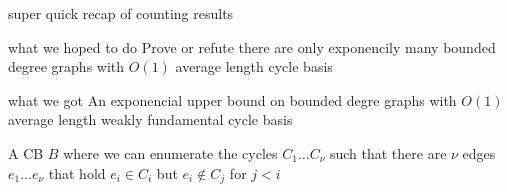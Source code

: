 \begin{frame}{super quick recap of counting results}
\begin{block}{what we hoped to do}
    Prove or refute there are only exponencily many bounded degree graphs with $O(1)$ average length cycle basis
\end{block}
\begin{block}
    {what we got}
    An exponencial upper bound on bounded degre graphs with $O(1)$ average length weakly fundamental cycle basis
\end{block}

\begin{definition}
    A CB $B$ where we can enumerate the cycles $C_1\ldots C_\nu$ such that there are  $\nu$ edges $e_1\ldots e_\nu$ that hold $e_i\in C_i$ but $e_i\notin C_j$ for $j<i$
\end{definition}
\end{frame}